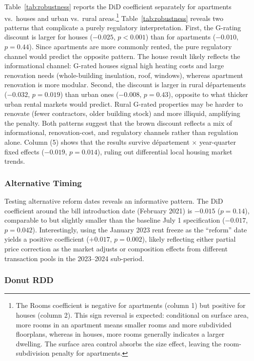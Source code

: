 \documentclass[12pt]{article}
\begin{document}
Table~\ref{tab:robustness} reports the DiD coefficient separately for apartments vs.\ houses and urban vs.\ rural areas.\footnote{The Rooms coefficient is negative for apartments (column 1) but positive for houses (column 2). This sign reversal is expected: conditional on surface area, more rooms in an apartment means smaller rooms and more subdivided floorplans, whereas in houses, more rooms generally indicates a larger dwelling. The surface area control absorbs the size effect, leaving the room-subdivision penalty for apartments.} Table~\ref{tab:robustness} reveals two patterns that complicate a purely regulatory interpretation. First, the G-rating discount is larger for houses ($-0.025$, $p < 0.001$) than for apartments ($-0.010$, $p = 0.44$). Since apartments are more commonly rented, the pure regulatory channel would predict the opposite pattern. The house result likely reflects the informational channel: G-rated houses signal high heating costs and large renovation needs (whole-building insulation, roof, windows), whereas apartment renovation is more modular. Second, the discount is larger in rural d\'epartements ($-0.032$, $p = 0.019$) than urban ones ($-0.008$, $p = 0.43$), opposite to what thicker urban rental markets would predict. Rural G-rated properties may be harder to renovate (fewer contractors, older building stock) and more illiquid, amplifying the penalty. Both patterns suggest that the brown discount reflects a mix of informational, renovation-cost, and regulatory channels rather than regulation alone. Column (5) shows that the results survive d\'epartement $\times$ year-quarter fixed effects ($-0.019$, $p = 0.014$), ruling out differential local housing market trends.

\subsubsection{Alternative Timing}

Testing alternative reform dates reveals an informative pattern. The DiD coefficient around the bill introduction date (February 2021) is $-0.015$ ($p = 0.14$), comparable to but slightly smaller than the baseline July 1 specification ($-0.017$, $p = 0.042$). Interestingly, using the January 2023 rent freeze as the ``reform'' date yields a positive coefficient ($+0.017$, $p = 0.002$), likely reflecting either partial price correction as the market adjusts or composition effects from different transaction pools in the 2023--2024 sub-period.

\subsubsection{Donut RDD}
\end{document}
